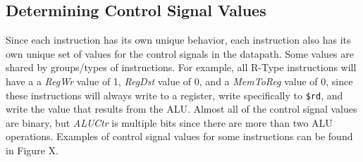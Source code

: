 \documentclass{article}
\begin{document}
\subsection{Determining Control Signal Values}
Since each instruction has its own unique behavior, each instruction also has its own unique set of values for the control signals in the datapath. Some values are shared by groups/types of instructions. For example, all R-Type instructions will have a a \textit{RegWr} value of 1, \textit{RegDst} value of 0, and a \textit{MemToReg} value of 0, since these instructions will always write to a register, write specifically to \texttt{\$rd}, and write the value that results from the ALU. Almost all of the control signal values are binary, but \textit{ALUCtr} is multiple bits since there are more than two ALU operations. Examples of control signal values for some instructions can be found in Figure X. 
\end{document}
